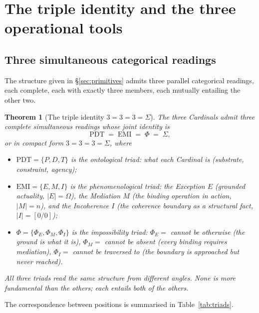 \documentclass[11pt,a4paper]{article}
\newtheorem{theorem}{Theorem}[section]
\theoremstyle{definition}
\theoremstyle{remark}
\begin{document}
\section{The triple identity and the three operational tools}\label{sec:triads}

\subsection{Three simultaneous categorical readings}

The structure given in \S\ref{sec:primitives} admits three parallel categorical readings, each complete, each with exactly three members, each mutually entailing the other two.

\begin{theorem}[The triple identity $3=3=3=\Sigma$]\label{thm:triads}
The three Cardinals admit three complete simultaneous readings whose joint identity is
\[
\boxed{\;\mathrm{PDT} \;=\; \mathrm{EMI} \;=\; \Phi \;=\; \Sigma,\;}
\]
or in compact form $3=3=3=\Sigma$, where
\begin{itemize}[leftmargin=*]
\item $\mathrm{PDT} = \{P,D,T\}$ is the \emph{ontological} triad: what each Cardinal is (substrate, constraint, agency);
\item $\mathrm{EMI} = \{E,M,I\}$ is the \emph{phenomenological} triad: the Exception $E$ (grounded actuality, $|E|=\Omega$), the Mediation $M$ (the binding operation in action, $|M|=n$), and the Incoherence $I$ (the coherence boundary as a structural fact, $|I|=[0/0]$);
\item $\Phi = \{\Phi_{E},\Phi_{M},\Phi_{I}\}$ is the \emph{impossibility} triad: $\Phi_{E} = $ \textit{cannot be otherwise} (the ground is what it is), $\Phi_{M} = $ \textit{cannot be absent} (every binding requires mediation), $\Phi_{I} = $ \textit{cannot be traversed to} (the boundary is approached but never reached).
\end{itemize}
All three triads read the same structure from different angles. None is more fundamental than the others; each entails both of the others.
\end{theorem}

The correspondence between positions is summarised in Table~\ref{tab:triads}.
\end{document}
